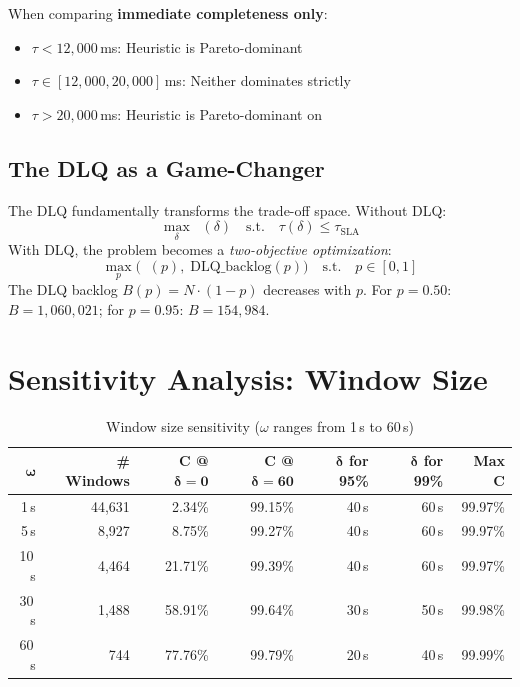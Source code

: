 \documentclass[11pt,a4paper]{article}
\DeclareMathOperator{\Cstrict}{C_{\text{strict}}}
\DeclareMathOperator{\Cimm}{C_{\text{imm}}}
\DeclareMathOperator{\Cev}{C_{\text{ev}}}
\begin{document}
When comparing \textbf{immediate completeness only}:
\begin{itemize}[leftmargin=*, itemsep=1pt]
  \item $\tau < 12{,}000$\,ms: Heuristic is Pareto-dominant
  \item $\tau \in [12{,}000, 20{,}000]$\,ms: Neither dominates strictly
  \item $\tau > 20{,}000$\,ms: Heuristic is Pareto-dominant on $\Cev$
\end{itemize}

\subsection{The DLQ as a Game-Changer}

The DLQ fundamentally transforms the trade-off space. Without DLQ:
\begin{equation}
  \max_{\delta} \Cstrict(\delta) \quad \text{s.t.} \quad \tau(\delta) \leq \tau_{\text{SLA}}
\end{equation}
With DLQ, the problem becomes a \textit{two-objective optimization}:
\begin{equation}
  \max_{p} \big(\Cimm(p),\; \text{DLQ\_backlog}(p)\big) \quad \text{s.t.} \quad p \in [0, 1]
\end{equation}
The DLQ backlog $B(p) = N \cdot (1-p)$ decreases with $p$.
For $p{=}0.50$: $B = 1{,}060{,}021$; for $p{=}0.95$: $B = 154{,}984$.

\section{Sensitivity Analysis: Window Size}

\begin{table}[H]
\centering
\caption{Window size sensitivity ($\omega$ ranges from 1\,s to 60\,s)}
\label{tab:sensitivity}
\begin{tabular}{rrrrrrr}
\toprule
$\bm{\omega}$ & \textbf{\# Windows} & $\mathbf{C}$ \textbf{@} $\bm{\delta{=}0}$ & $\mathbf{C}$ \textbf{@} $\bm{\delta{=}60}$ & $\bm{\delta}$ \textbf{for 95\%} & $\bm{\delta}$ \textbf{for 99\%} & \textbf{Max} $\mathbf{C}$ \\
\midrule
1\,s  & 44,631 & 2.34\%  & 99.15\% & 40\,s & 60\,s  & 99.97\% \\
5\,s  & 8,927  & 8.75\%  & 99.27\% & 40\,s & 60\,s  & 99.97\% \\
10\,s & 4,464  & 21.71\% & 99.39\% & 40\,s & 60\,s  & 99.97\% \\
30\,s & 1,488  & 58.91\% & 99.64\% & 30\,s & 50\,s  & 99.98\% \\
60\,s & 744    & 77.76\% & 99.79\% & 20\,s & 40\,s  & 99.99\% \\
\bottomrule
\end{tabular}
\end{table}
\end{document}
